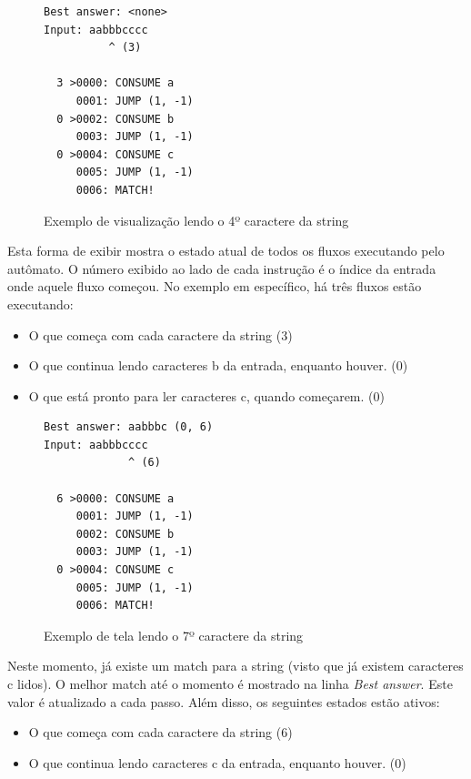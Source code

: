 \documentclass[a4paper,12pt,oneside,onecolumn]{uerj}
\begin{document}
\begin{figure}[ht]
  \centering
\begin{verbatim}
Best answer: <none>
Input: aabbbcccc
          ^ (3)

  3 >0000: CONSUME a
     0001: JUMP (1, -1)
  0 >0002: CONSUME b
     0003: JUMP (1, -1)
  0 >0004: CONSUME c
     0005: JUMP (1, -1)
     0006: MATCH!
\end{verbatim}
  \caption{Exemplo de visualização lendo o 4º caractere da string}
  \label{fig:exemplo_view_passo_3}
\end{figure}

Esta forma de exibir mostra o estado atual de todos os fluxos executando pelo autômato. O número exibido ao lado de cada instrução é o índice da entrada onde aquele fluxo começou. No exemplo em específico, há três fluxos estão executando: 

\begin{itemize}
\item{O que começa com cada caractere da string (3)}
\item{O que continua lendo caracteres b da entrada, enquanto houver. (0)}
\item{O que está pronto para ler caracteres c, quando começarem. (0)}
\end{itemize}


\begin{figure}[ht]
  \centering
\begin{verbatim}
Best answer: aabbbc (0, 6)
Input: aabbbcccc
             ^ (6)

  6 >0000: CONSUME a
     0001: JUMP (1, -1)
     0002: CONSUME b
     0003: JUMP (1, -1)
  0 >0004: CONSUME c
     0005: JUMP (1, -1)
     0006: MATCH!
\end{verbatim}
  \caption{Exemplo de tela lendo o 7º caractere da string}
  \label{fig:exemplo_view_passo_6}
\end{figure}

Neste momento, já existe um match para a string (visto que já existem caracteres c lidos). O melhor match até o momento é mostrado na linha \emph{Best answer}. Este valor é atualizado a cada passo. Além disso, os seguintes estados estão ativos:

\begin{itemize}
\item{O que começa com cada caractere da string (6)}
\item{O que continua lendo caracteres c da entrada, enquanto houver. (0)}
\end{itemize}
\end{document}
